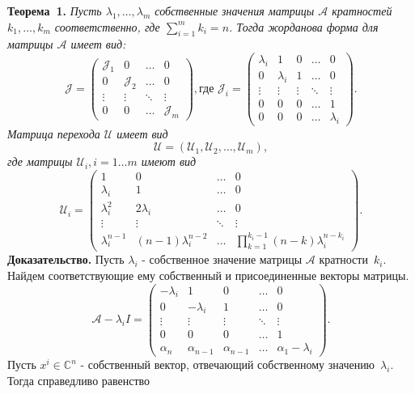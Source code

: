 \textbf{Теорема~1.}
{ \it Пусть $\lambda_1, \ldots , \lambda_m$ собственные значения матрицы $\mathcal{A}$ кратностей $k_1, \ldots , k_m$ соответственно, где $\sum\limits_{i=1}^m k_i = n$. Тогда жорданова форма для матрицы $\mathcal{A}$ имеет вид:
$$
	\mathcal{J} = \begin{pmatrix}
		\mathcal{J}_1 & 0 & \dots & 0 \\
		0 & \mathcal{J}_2 & \dots & 0 \\
		\vdots & \vdots & \ddots & \vdots \\
		0 & 0 & \dots & \mathcal{J}_m
	\end{pmatrix}, {\text{где }}
	\mathcal{J}_i = \begin{pmatrix}
		\lambda_i & 1 & 0 & \dots & 0 \\
		0 & \lambda_i & 1 & \dots & 0 \\
		\vdots & \vdots & \vdots & \ddots & \vdots \\
		0 & 0 & 0 & \dots & 1 \\
		0 & 0 & 0 & \dots & \lambda_i
	\end{pmatrix}.
$$
Матрица перехода $\mathcal{U}$ имеет вид
$$
\mathcal{U} = \left( \mathcal{U}_1, \mathcal{U}_2, \dots, \mathcal{U}_m \right),
$$
где матрицы $\mathcal{U}_i, i=1 \dots m$ имеют вид
$$
\mathcal{U}_i = \begin{pmatrix}
1 & 0 & \dots & 0 \\
\lambda_i & 1 & \dots & 0 \\ 
\lambda_i^2 & 2\lambda_i & \dots & 0 \\
\vdots & \vdots & \ddots & \vdots \\
\lambda_i^{n-1} & (n-1)\lambda_i^{n-2} & \dots & \prod_{k=1}^{k_i-1}(n-k)\lambda_i^{n-k_i}
\end{pmatrix}.
$$
}
\textbf{Доказательство.} Пусть $\lambda_i$ - собственное значение матрицы $\mathcal{A}$ кратности~$k_i$. Найдем соответствующие ему собственный и присоединенные векторы матрицы.
$$
\mathcal{A}-\lambda_i I = 
\begin{pmatrix}
	-\lambda_i & 1 & 0 & \dots & 0 \\
	0 & -\lambda_i & 1 & \dots & 0 \\
	\vdots & \vdots & \vdots & \ddots & \vdots \\
	0 & 0 & 0 & \dots & 1 \\
	\alpha_n & \alpha_{n-1} & \alpha_{n-1} & \dots & \alpha_1-\lambda_i
\end{pmatrix}.
$$ 
Пусть $x^i \in \mathbb{C}^n$ - собственный вектор, отвечающий собственному значению~$\lambda_i$. Тогда справедливо равенство
